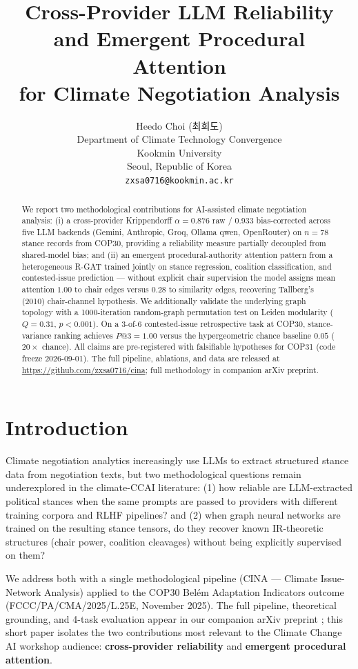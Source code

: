 \documentclass{article}
\title{Cross-Provider LLM Reliability and Emergent Procedural Attention\\
       for Climate Negotiation Analysis}
\author{%
  Heedo Choi (최희도) \\
  Department of Climate Technology Convergence \\
  Kookmin University \\
  Seoul, Republic of Korea \\
  \texttt{zxsa0716@kookmin.ac.kr}
}
\begin{document}
\maketitle

\begin{abstract}
We report two methodological contributions for AI-assisted climate negotiation analysis: (i) a cross-provider Krippendorff $\alpha = 0.876$ raw / $0.933$ bias-corrected across five LLM backends (Gemini, Anthropic, Groq, Ollama qwen, OpenRouter) on $n=78$ stance records from COP30, providing a reliability measure partially decoupled from shared-model bias; and (ii) an emergent procedural-authority attention pattern from a heterogeneous R-GAT trained jointly on stance regression, coalition classification, and contested-issue prediction --- without explicit chair supervision the model assigns mean attention $1.00$ to chair edges versus $0.28$ to similarity edges, recovering Tallberg's (2010) chair-channel hypothesis. We additionally validate the underlying graph topology with a 1000-iteration random-graph permutation test on Leiden modularity ($Q=0.31$, $p<0.001$). On a 3-of-6 contested-issue retrospective task at COP30, stance-variance ranking achieves $P@3=1.00$ versus the hypergeometric chance baseline $0.05$ ($20\times$ chance). All claims are pre-registered with falsifiable hypotheses for COP31 (code freeze 2026-09-01). The full pipeline, ablations, and data are released at \url{https://github.com/zxsa0716/cina}; full methodology in companion arXiv preprint.
\end{abstract}

\section{Introduction}
\label{sec:intro}

Climate negotiation analytics increasingly use LLMs to extract structured stance data from negotiation texts, but two methodological questions remain underexplored in the climate-CCAI literature: (1) how reliable are LLM-extracted political stances when the same prompts are passed to providers with different training corpora and RLHF pipelines? and (2) when graph neural networks are trained on the resulting stance tensors, do they recover known IR-theoretic structures (chair power, coalition cleavages) without being explicitly supervised on them?

We address both with a single methodological pipeline (CINA --- Climate Issue-Network Analysis) applied to the COP30 Belém Adaptation Indicators outcome (FCCC/PA/CMA/2025/L.25E, November 2025). The full pipeline, theoretical grounding, and 4-task evaluation appear in our companion arXiv preprint \citep{cina2026arxiv}; this short paper isolates the two contributions most relevant to the Climate Change AI workshop audience: \textbf{cross-provider reliability} and \textbf{emergent procedural attention}.
\end{document}
